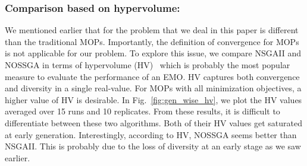 \subsubsection{Comparison based on hypervolume:} We mentioned earlier that for the problem that we deal in this paper is different than the traditional MOPs. Importantly, the definition of convergence for MOPs is not applicable for our problem. To explore this issue, we compare NSGAII and NOSSGA in terms of hypervolume (HV)~\cite{zitzler1999multiobjective} which is probably the most popular measure to evaluate the performance of an EMO. HV captures both convergence and diversity in a single real-value. For MOPs with all minimization objectives, a higher value of HV is desirable. In Fig.~\ref{fig:gen_wise_hv}, we plot the HV values averaged over 15 runs and 10 replicates. From these results, it is difficult to differentiate between these two algorithms. Both of their HV values get saturated at early generation. Interestingly, according to HV, NOSSGA seems better than NSGAII. This is probably due to the loss of diversity at an early stage as we saw earlier. 
